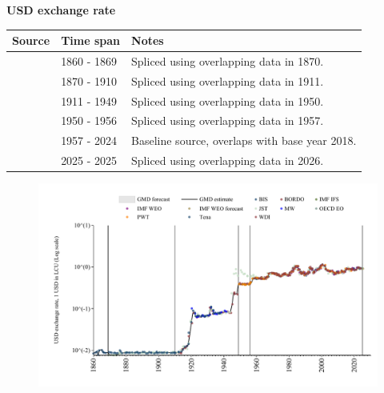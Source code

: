 \documentclass[12pt,a4paper,landscape]{article}
\begin{document}
\begin{adjustbox}{max totalsize={\paperwidth}{\paperheight},center}
\begin{minipage}[t][\textheight][t]{\textwidth}
\vspace*{0.5cm}
{}
\begin{center}
{\Large\bfseries USD exchange rate}
\end{center}
\vspace{0.5cm}
\begin{table}[H]
\centering
\small
\begin{tabular}{|l|l|l|}
\hline
\textbf{Source} & \textbf{Time span} & \textbf{Notes} \\
\hline
\rowcolor{white}\cite{Tena}& 1860 - 1869 &Spliced using overlapping data in 1870. \\
\rowcolor{lightgray}\cite{JST}& 1870 - 1910 &Spliced using overlapping data in 1911. \\
\rowcolor{white}\cite{BORDO}& 1911 - 1949 &Spliced using overlapping data in 1950. \\
\rowcolor{lightgray}\cite{IMF_IFS}& 1950 - 1956 &Spliced using overlapping data in 1957. \\
\rowcolor{white}\cite{BIS}& 1957 - 2024 &Baseline source, overlaps with base year 2018. \\
\rowcolor{lightgray}\cite{OECD_EO}& 2025 - 2025 &Spliced using overlapping data in 2026. \\
\hline
\end{tabular}
\end{table}
\begin{figure}[H]
\centering
\includegraphics[width=\textwidth,height=0.6\textheight,keepaspectratio]{graphs/FIN_USDfx.pdf}
\end{figure}
\end{minipage}
\end{adjustbox}
\end{document}

